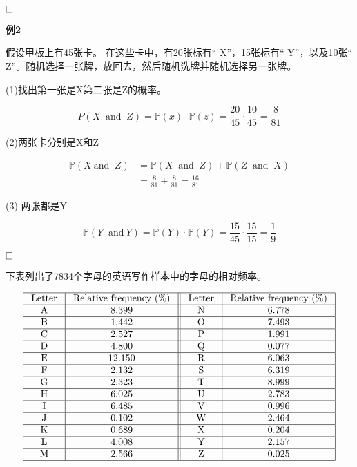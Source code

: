 \documentclass{article}
\begin{document}
$\hfill\square$ 

\textbf{例2}

假设甲板上有45张卡。 在这些卡中，有20张标有“ X”，15张标有“ Y”，以及10张“ Z”。随机选择一张牌，放回去，然后随机洗牌并随机选择另一张牌。 

(1)找出第一张是X第二张是Z的概率。

$$
P(X \ \text { and } \ Z)=\mathbb{P}(x) \cdot \mathbb{P}(z)=\frac{20}{45} \cdot \frac{10}{45}=\frac{8}{81}
$$

(2)两张卡分别是X和Z

$$
\begin{aligned}
\mathbb{P}\left(X \ \text {and } \ Z\right) &=\mathbb{P}(X \ \text { and } \ Z)+\mathbb{P}(Z \ \text { and } \ X) \\
&=\frac{8}{81}+\frac{8}{81}=\frac{16}{81}
\end{aligned}
$$

(3) 两张都是Y

$$
\mathbb{P}(Y \ \text { and} \ Y)=\mathbb{P}(Y) \cdot \mathbb{P}(Y)=\frac{15}{45} \cdot \frac{15}{15}=\frac{1}{9}
$$ 

$\hfill\square$ 




下表列出了7834个字母的英语写作样本中的字母的相对频率。

$$
\begin{array}{|c|c||c|c|}
\hline \text { Letter } & \text { Relative  frequency (\%) } & \text { Letter } & \text { Relative  frequency (\%) } \\
\hline \text { A } & 8.399 & \text { N } & 6.778 \\
\hline \text { B } & 1.442 & \text { O } & 7.493 \\
\hline \text { C } & 2.527 & \text { P } & 1.991 \\
\hline \text { D } & 4.800 & \text { Q } & 0.077 \\
\hline \text { E } & 12.150 & \text { R } & 6.063 \\
\hline \text { F } & 2.132 & \text { S } & 6.319 \\
\hline \text { G } & 2.323 & \text { T } & 8.999 \\
\hline \text { H } & 6.025 & \text { U } & 2.783 \\
\hline \text { I } & 6.485 & \text { V } & 0.996 \\
\hline \text { J } & 0.102 & \text { W } & 2.464 \\
\hline \text { K } & 0.689 & \text { X } & 0.204 \\
\hline \text { L } & 4.008 & \text { Y } & 2.157 \\
\hline \text { M } & 2.566 & \text { Z } & 0.025 \\
\hline
\end{array}
$$
\end{document}
